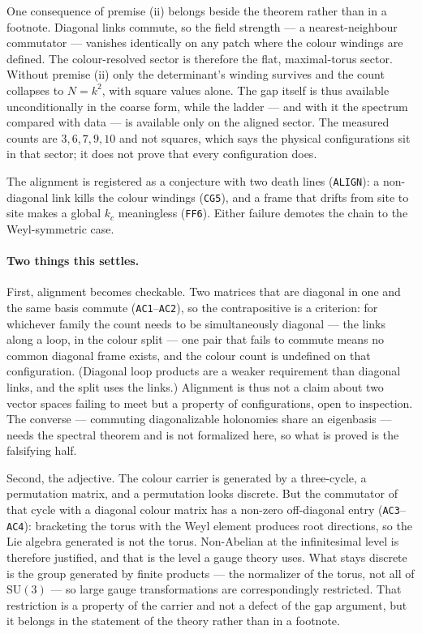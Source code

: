 \documentclass[aps,prd,preprint,superscriptaddress,amsmath,amssymb]{revtex4-2}
\begin{document}
One consequence of premise (ii) belongs beside the theorem rather than in a
footnote.  Diagonal links commute, so the field strength --- a
nearest-neighbour commutator --- vanishes identically on any patch where the
colour windings are defined.  The colour-resolved sector is therefore the
flat, maximal-torus sector.  Without premise (ii) only the determinant's
winding survives and the count collapses to $N=k^2$, with square values
alone.  The gap itself is thus available unconditionally in the coarse
form, while the ladder --- and with it the spectrum compared with data --- is
available only on the aligned sector.  The measured counts are $3,6,7,9,10$
and not squares, which says the physical configurations sit in that sector;
it does not prove that every configuration does.

The alignment is registered as a conjecture with two death lines
(\texttt{ALIGN}): a non-diagonal link kills the colour windings
(\texttt{CG5}), and a frame that drifts from site to site makes a global
$k_c$ meaningless (\texttt{FF6}).  Either failure demotes the chain to the
Weyl-symmetric case.

\paragraph{Two things this settles.}
First, alignment becomes checkable.  Two matrices that are diagonal in one
and the same basis commute (\texttt{AC1}--\texttt{AC2}), so the
contrapositive is a criterion: for whichever family the count needs to be
simultaneously diagonal --- the links along a loop, in the colour split ---
one pair that fails to commute means no common diagonal frame exists, and
the colour count is undefined on that configuration.  (Diagonal loop
products are a weaker requirement than diagonal links, and the split uses
the links.)  Alignment is thus not a claim about two
vector spaces failing to meet but a property of configurations, open to
inspection.  The converse --- commuting diagonalizable holonomies share an
eigenbasis --- needs the spectral theorem and is not formalized here, so what
is proved is the falsifying half.

Second, the adjective.  The colour carrier is generated by a three-cycle, a
permutation matrix, and a permutation looks discrete.  But the commutator of
that cycle with a diagonal colour matrix has a non-zero off-diagonal entry
(\texttt{AC3}--\texttt{AC4}): bracketing the torus with the Weyl element
produces root directions, so the Lie algebra generated is not the torus.
Non-Abelian at the infinitesimal level is therefore justified, and that is
the level a gauge theory uses.  What stays discrete is the group generated by
finite products --- the normalizer of the torus, not all of $\mathrm{SU}(3)$
--- so large gauge transformations are correspondingly restricted.  That
restriction is a property of the carrier and not a defect of the gap
argument, but it belongs in the statement of the theory rather than in a
footnote.
\end{document}
